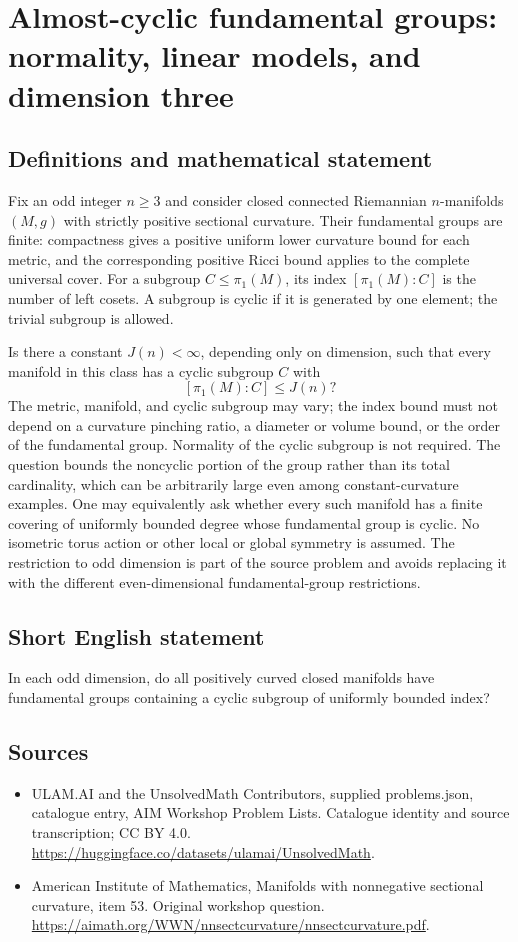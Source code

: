 \documentclass[11pt,a4paper]{article}
\begin{document}
\section*{Almost-cyclic fundamental groups: normality, linear models, and dimension three}\label{statement}

\subsection{Definitions and mathematical statement}
Fix an odd integer $n\geq3$ and consider closed connected Riemannian $n$-manifolds $(M,g)$ with strictly positive sectional curvature.
Their fundamental groups are finite: compactness gives a positive uniform lower curvature bound for each metric, and the corresponding positive Ricci bound applies to the complete universal cover.
For a subgroup $C\leq\pi_1(M)$, its index $[\pi_1(M):C]$ is the number of left cosets.
A subgroup is cyclic if it is generated by one element; the trivial subgroup is allowed.

Is there a constant $J(n)<\infty$, depending only on dimension, such that every manifold in this class has a cyclic subgroup $C$ with
\[
 [\pi_1(M):C]\leq J(n)?
\]
The metric, manifold, and cyclic subgroup may vary; the index bound must not depend on a curvature pinching ratio, a diameter or volume bound, or the order of the fundamental group.
Normality of the cyclic subgroup is not required.
The question bounds the noncyclic portion of the group rather than its total cardinality, which can be arbitrarily large even among constant-curvature examples.
One may equivalently ask whether every such manifold has a finite covering of uniformly bounded degree whose fundamental group is cyclic.
No isometric torus action or other local or global symmetry is assumed.
The restriction to odd dimension is part of the source problem and avoids replacing it with the different even-dimensional fundamental-group restrictions.
\subsection{Short English statement}
In each odd dimension, do all positively curved closed manifolds have fundamental groups containing a cyclic subgroup of uniformly bounded index?
\subsection{Sources}
\begin{itemize}
\item[S1] ULAM.AI and the UnsolvedMath Contributors, supplied problems.json, catalogue entry, AIM Workshop Problem Lists. Catalogue identity and source transcription; CC BY 4.0.
\url{https://huggingface.co/datasets/ulamai/UnsolvedMath}.
\item[S2] American Institute of Mathematics, Manifolds with nonnegative sectional curvature, item 53. Original workshop question.
\url{https://aimath.org/WWN/nnsectcurvature/nnsectcurvature.pdf}.
\end{itemize}
\end{document}
